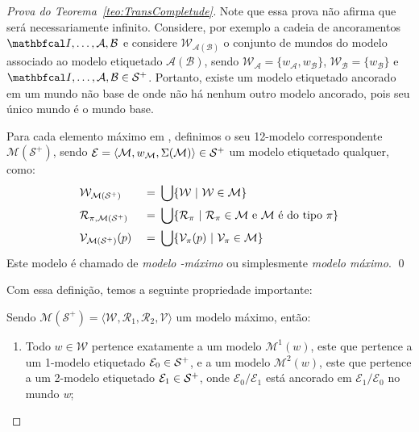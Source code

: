 \begin{apendicesenv}
\begin{proof}[Prova do Teorema~\ref{teo:TransCompletude}]
            Note que essa prova não afirma que  será necessariamente infinito. Considere, por exemplo a cadeia de ancoramentos
            \(\modeloinicial, \dots, \mathcal{A}, \mathcal{B}\) e considere \(\mathcal{W}_{\mathcal{A}(\mathcal{B})}\) o conjunto de mundos do modelo
            associado ao modelo etiquetado \(\mathcal{A}(\mathcal{B})\), sendo \(\mathcal{W}_{\mathcal{A}} = \{w_{\mathcal{A}}, w_{\mathcal{B}}\}\),
            \(\mathcal{W}_{\mathcal{B}} = \{w_{\mathcal{B}}\}\) e \(\modeloinicial, \dots, \mathcal{A}, \mathcal{B} \in \mathcal{S}^{+}\). Portanto, existe um
            modelo etiquetado ancorado em um mundo não base de  onde não há nenhum outro modelo ancorado, pois seu único mundo é o mundo base.

            \begin{definicao}
                \label{def:Definicao4}
                Para cada elemento máximo  em , definimos o seu 12-modelo correspondente \(\mathcal{M}(\mathcal{S}^{+})\),
                sendo \(\mathcal{E} = \langle \mathcal{M}, w_{\mathcal{M}}, \Sigma(\mathcal{M}) \rangle \in \mathcal{S}^{+}\) um modelo etiquetado qualquer, como:
                \begin{alignat*}{3}
                    &\mathcal{W}_{\mathcal{M}(\mathcal{S}^{+})}\ &=&\  \bigcup\{\mathcal{W} \ | \ \mathcal{W} \in \mathcal{M}\} \\
                    &\mathcal{R}_{\pi, \mathcal{M}(\mathcal{S}^{+})}\ &=&\  \bigcup\{\mathcal{R}_{\pi} \ | \ \mathcal{R}_{\pi} \in \mathcal{M}
                        \text{ e } \mathcal{M} \text{ é do tipo \PI}\} \\
                    &\mathcal{V}_{\mathcal{M}(\mathcal{S}^{+})}(p)\ &=&\  \bigcup\{\mathcal{V}_{\pi}(p) \ | \ \mathcal{V}_{\pi} \in \mathcal{M}\}
                \end{alignat*}
                Este modelo é chamado de \textit{modelo -máximo} ou simplesmente \textit{modelo máximo}. \qed
            \end{definicao}

            Com essa definição, temos a seguinte propriedade importante:

            \begin{lema}
                \label{teo:Lema6}
                Sendo \(\mathcal{M}(\mathcal{S}^{+}) = \langle \mathcal{W}, \mathcal{R}_{1}, \mathcal{R}_2, \mathcal{V} \rangle\) um modelo máximo, então:
                \begin{enumerate}[label=\textnormal{\ref{teo:Lema6}.\arabic*}]
                    \item \textnormal{Todo \(w \in \mathcal{W}\) pertence exatamente a um modelo \(\mathcal{M}^{1}(w)\), este que pertence a um 1-modelo etiquetado
                    \(\mathcal{E}_{0} \in \mathcal{S}^{+}\), e a um modelo \(\mathcal{M}^{2}(w)\), este que pertence a um 2-modelo etiquetado \(\mathcal{E}_{1} \in \mathcal{S}^{+}\),
                    onde \(\mathcal{E}_{0}/\mathcal{E}_{1}\) está ancorado em \(\mathcal{E}_{1}/\mathcal{E}_{0}\) no mundo \textit{w};} \label{caso:Lema6-1}


\end{enumerate}
\end{lema}
\end{proof}
\end{apendicesenv}
